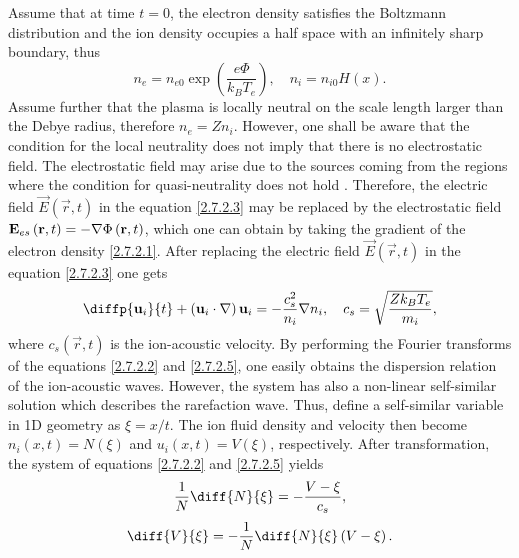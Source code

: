 Assume that at time $ t = 0 $, the electron density satisfies the Boltzmann distribution and the ion density occupies a half space with an infinitely sharp boundary, thus
\begin{equation}
\label{2.7.2.1}
n_e = n_{e0} \exp{\left( \frac{e \Phi}{k_B T_e} \right)}, \quad n_i = n_{i0} H(x).
\end{equation}
Assume further that the plasma is locally neutral on the scale length larger than the Debye radius, therefore $ n_e = Z n_i $. However, one shall be aware that the condition for the local neutrality does not imply that there is no electrostatic field. The electrostatic field may arise due to the sources coming from the regions where the condition for quasi-neutrality does not hold \cite{Macchi2013}. Therefore, the electric field  $ \vec{E} \left(\vec{r}, t\right) $ in the equation \ref{2.7.2.3} may be replaced by the electrostatic field $ \mathbf{E}_{es} \left(\mathbf{r}, t\right) = -\nabla \Phi \left(\mathbf{r}, t\right) $, which one can obtain by taking the gradient of the electron density \ref{2.7.2.1}. After replacing the electric field $ \vec{E} \left(\vec{r}, t\right) $ in the equation \ref{2.7.2.3} one gets
\begin{equation}
\label{2.7.2.5}
\diffp{\vec{u}_i}{t} + \left(\vec{u}_i \cdot \grad{} \right) \vec{u}_i = - \frac{c_s^2}{n_i} \grad{n_i}, \quad c_s = \sqrt{\frac{Z k_B T_e}{m_i}},
\end{equation}
where $ c_s \left(\vec{r}, t\right) $ is the ion-acoustic velocity. By performing the Fourier transforms of the equations \ref{2.7.2.2} and \ref{2.7.2.5}, one easily obtains the dispersion relation of the ion-acoustic waves. However, the system has also a non-linear self-similar solution which describes the rarefaction wave. Thus, define a self-similar variable in 1D geometry as $ \xi = x/t $. The ion fluid density and velocity then become $ n_i \left(x, t\right) = N \left( \xi \right) $ and $ u_i \left(x, t\right) = V \left( \xi \right) $, respectively. After transformation, the system of equations \ref{2.7.2.2} and \ref{2.7.2.5} yields
\begin{equation}
\label{2.7.2.6}
\frac{1}{N} \diff{N}{\xi} = - \frac{V - \xi}{c_s},
\end{equation}
\begin{equation}
\label{2.7.2.7}
\diff{V}{\xi} = - \frac{1}{N} \diff{N}{\xi} \left(V - \xi \right).
\end{equation}

